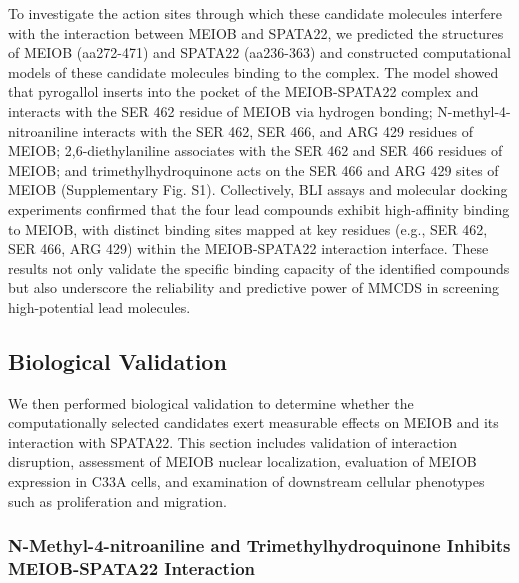 \documentclass[unnumsec,webpdf,contemporary,large]{oup-authoring-template}%
\theoremstyle{thmstyleone}%
\theoremstyle{thmstyletwo}%
\theoremstyle{thmstylethree}%
\begin{document}
To investigate the action sites through which these candidate molecules interfere with the interaction between MEIOB and SPATA22, we predicted the structures of MEIOB (aa272-471) and SPATA22 (aa236-363) and constructed computational models of these candidate molecules binding to the complex. The model showed that pyrogallol inserts into the pocket of the MEIOB-SPATA22 complex and interacts with the SER 462 residue of MEIOB via hydrogen bonding; N-methyl-4-nitroaniline interacts with the SER 462, SER 466, and ARG 429 residues of MEIOB; 2,6-diethylaniline associates with the SER 462 and SER 466 residues of MEIOB; and trimethylhydroquinone acts on the SER 466 and ARG 429 sites of MEIOB (Supplementary  Fig. S1). Collectively, BLI assays and molecular docking experiments confirmed that the four lead compounds exhibit high-affinity binding to MEIOB, with distinct binding sites mapped at key residues (e.g., SER 462, SER 466, ARG 429) within the MEIOB-SPATA22 interaction interface. These results not only validate the specific binding capacity of the identified compounds but also underscore the reliability and predictive power of MMCDS in screening high-potential lead molecules.



\subsection*{Biological Validation}


We then performed biological validation to determine whether the computationally selected candidates exert measurable effects on MEIOB and its interaction with SPATA22. This section includes validation of interaction disruption, assessment of MEIOB nuclear localization, evaluation of MEIOB expression in C33A cells, and examination of downstream cellular phenotypes such as proliferation and migration.


\subsubsection*{N-Methyl-4-nitroaniline and Trimethylhydroquinone Inhibits MEIOB-SPATA22 Interaction}
\end{document}

